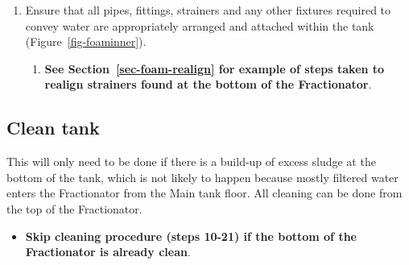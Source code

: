 \documentclass[
  12pt,
]{report}
\providecommand{\tightlist}{%
  \setlength{\itemsep}{0pt}\setlength{\parskip}{0pt}}\usepackage{longtable,booktabs,array}
\begin{document}
\begin{enumerate}
\def\labelenumi{\arabic{enumi}.}
\setcounter{enumi}{8}
\tightlist
\item
  Ensure that all pipes, fittings, strainers and any other fixtures
  required to convey water are appropriately arranged and attached
  within the tank (Figure~\ref{fig-foaminner}).

  \begin{enumerate}
  \def\labelenumii{\roman{enumii})}
  \tightlist
  \item
    \textbf{See Section~\ref{sec-foam-realign} for example of steps
    taken to realign strainers found at the bottom of the Fractionator}.
  \end{enumerate}
\end{enumerate}

\hypertarget{sec-foam-clean}{%
\subsection{Clean tank}\label{sec-foam-clean}}

{This will only need to be done if there is a build-up of excess sludge
at the bottom of the tank, which is not likely to happen because mostly
filtered water enters the Fractionator from the Main tank floor}. {All
cleaning can be done from the top of the Fractionator}.

\begin{itemize}
\tightlist
\item
  \textbf{Skip cleaning procedure (steps 10-21) if the bottom of the
  Fractionator is already clean}.
\end{itemize}
\end{document}

